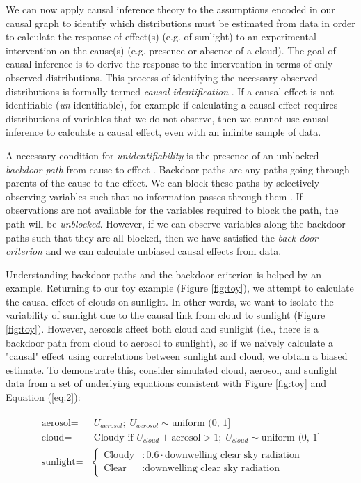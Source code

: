 \documentclass[12pt]{article}
\begin{document}
We can now apply causal inference theory
\citep[e.g.,][]{pearl1995causal,tian2002general,shpitser2006} to the
assumptions encoded in our causal graph to identify which
distributions must be estimated from data in order to calculate the
response of effect(s) (e.g. of sunlight) to an experimental
intervention on the cause(s) (e.g. presence or absence of a
cloud). The goal of causal inference is to derive the response to the
intervention in terms of only observed distributions. This process of
identifying the necessary observed distributions is formally termed
\emph{causal identification} \citep[][, Ch. 3]{pearl2009causality}. If
a causal effect is not identifiable (\emph{un}-identifiable), for
example if calculating a causal effect requires distributions of
variables that we do not observe, then we cannot use causal inference
to calculate a causal effect, even with an infinite sample of
data.

A necessary condition for \emph{unidentifiability} is the presence of
an unblocked \emph{backdoor path} from cause to effect \citep[][,
Ch. 3]{pearl2009causality}. Backdoor paths are any paths going
through parents of the cause to the effect. We can block these paths
by selectively observing variables such that no information passes
through them \citep{geiger-d-sep}. If observations are not available
for the variables required to block the path, the path will be
\emph{unblocked}. However, if we can observe variables along the
backdoor paths such that they are all blocked, then we have satisfied
the \emph{back-door criterion} \citep{pearl2009} and we can calculate
unbiased causal effects from data.

Understanding backdoor paths and the backdoor criterion is helped by
an example. Returning to our toy example (Figure \ref{fig:toy}), we
attempt to calculate the causal effect of clouds on sunlight. In other
words, we want to isolate the variability of sunlight due to the
causal link from cloud to sunlight (Figure \ref{fig:toy}). However,
aerosols affect both cloud and sunlight (i.e., there is a backdoor
path from cloud to aerosol to sunlight), so if we naively calculate a
"causal" effect using correlations between sunlight and cloud, we obtain
a biased estimate. To demonstrate this, consider simulated cloud,
aerosol, and sunlight data from a set of underlying equations
consistent with Figure \ref{fig:toy} and Equation (\ref{eq:2}):


\begin{align}
  \begin{split}
    \text{aerosol} =& \; U_{aerosol}; \; U_{aerosol} \sim
    \text{uniform (0, 1]}\\ \text{cloud} =& \; \text{Cloudy if } U_{cloud} +
    \text{aerosol} > 1; \; U_{cloud} \sim \text{uniform (0, 1]}\\ \text{sunlight}
    =& \begin{cases} \text{Cloudy} &: 0.6 \cdot \text{downwelling clear
        sky radiation} \\ \text{Clear} &: \text{downwelling clear sky
        radiation}
    \end{cases}
    \label{eq:1}
  \end{split}
\end{align}
\end{document}
